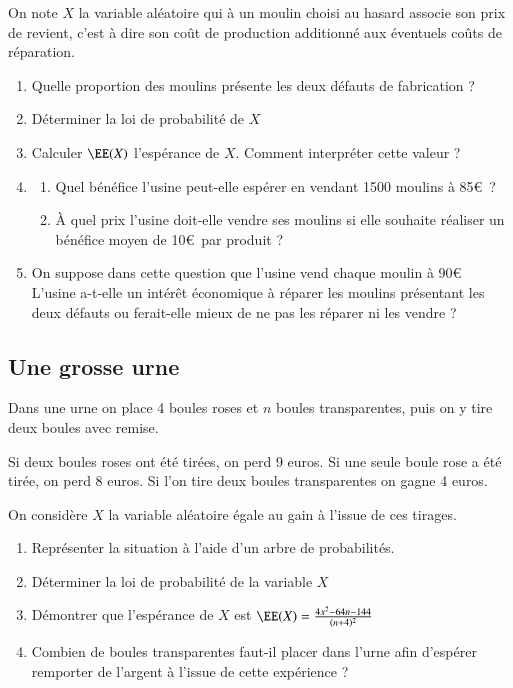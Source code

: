 \documentclass[oneside,12pt]{article}          %
\begin{document}
On note $X$ la variable aléatoire qui à un moulin choisi au hasard associe son prix de revient, c'est à dire son coût de production additionné aux éventuels coûts de réparation.
\begin{enumerate}
    \item Quelle proportion des moulins présente les deux défauts de fabrication ?
    \item Déterminer la loi de probabilité de $X$
    \item Calculer $\EE(X)$ l'espérance de $X$. Comment interpréter cette valeur ?
    \item \begin{enumerate}
        \item Quel bénéfice l'usine peut-elle espérer en vendant 1500 moulins à 85\euro\, ?
        \item À quel prix l'usine doit-elle vendre ses moulins si elle souhaite réaliser un bénéfice moyen de 10\euro\, par produit ?
    \end{enumerate}
    \item On suppose dans cette question que l'usine vend chaque moulin à 90\euro\\
    L'usine a-t-elle un intérêt économique à réparer les moulins présentant les deux défauts ou ferait-elle mieux de ne pas les réparer ni les vendre ?
\end{enumerate}



\subsection{Une grosse urne}
Dans une urne on place 4 boules roses et $n$ boules transparentes, puis on y tire deux boules avec remise.

Si deux boules roses ont été tirées, on perd 9 euros. Si une seule boule rose a été tirée, on perd 8 euros. Si l'on tire deux boules transparentes on gagne 4 euros.

On considère $X$ la variable aléatoire égale au gain à l'issue de ces tirages.
\begin{enumerate}
    \item Représenter la situation à l'aide d'un arbre de probabilités.
    \item Déterminer la loi de probabilité de la variable $X$
    \item Démontrer que l'espérance de $X$ est $\EE(X)=\frac{4x^2-64n-144}{(n+4)^2}$
    \item Combien de boules transparentes faut-il placer dans l'urne afin d'espérer remporter de l'argent à l'issue de cette expérience ?
\end{enumerate}
\end{document}
